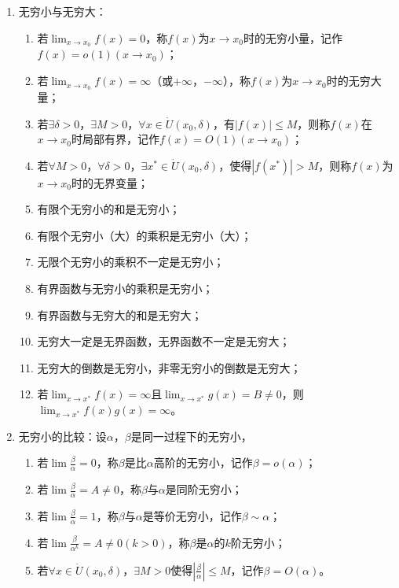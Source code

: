 \documentclass[UTF8]{ctexart}
\theoremstyle{remark}
\begin{document}
\begin{enumerate}
			\item 无穷小与无穷大：
			\begin{enumerate}
				\item 若$\lim _{x \to x_{0}} f(x)=0$，称$f(x)$为$x \to x_{0}$时的无穷小量，记作$f(x)=o(1)(x \to x_{0})$；
				\item 若$\lim _{x \to x_{0}} f(x)=\infty$（或$+\infty$，$-\infty$），称$f(x)$为$x \to x_{0}$时的无穷大量；
				\item 若$\exists \delta>0$，$\exists M>0$，$\forall x \in \dot{U}(x_{0}, \delta)$，有$|f(x)| \leq M$，则称$f(x)$在$x \to x_{0}$时局部有界，记作$f(x)=O(1)(x \to x_{0})$；
				\item 若$\forall M>0$，$\forall \delta>0$，$\exists x^{*} \in \dot{U}(x_{0}, \delta)$，使得$|f(x^{*})|>M$，则称$f(x)$为$x \to x_{0}$时的无界变量；
				\item 有限个无穷小的和是无穷小；
				\item 有限个无穷小（大）的乘积是无穷小（大）；
				\item 无限个无穷小的乘积不一定是无穷小；
				\item 有界函数与无穷小的乘积是无穷小；
				\item 有界函数与无穷大的和是无穷大；
				\item 无穷大一定是无界函数，无界函数不一定是无穷大；
				\item 无穷大的倒数是无穷小，非零无穷小的倒数是无穷大；
				\item 若$\lim _{x \to x^{*}} f(x)=\infty$且$\lim _{x \to x^{*}} g(x)=B \neq 0$，则$\lim _{x \to x^{*}} f(x) g(x)=\infty$。
			\end{enumerate}
			
			\item 无穷小的比较：设$\alpha$，$\beta$是同一过程下的无穷小，
			\begin{enumerate}
				\item 若$\lim \frac{\beta}{\alpha}=0$，称$\beta$是比$\alpha$高阶的无穷小，记作$\beta=o(\alpha)$；
				\item 若$\lim \frac{\beta}{\alpha}=A \neq 0$，称$\beta$与$\alpha$是同阶无穷小；
				\item 若$\lim \frac{\beta}{\alpha}=1$，称$\beta$与$\alpha$是等价无穷小，记作$\beta \sim \alpha$；
				\item 若$\lim \frac{\beta}{\alpha^{k}}=A \neq 0(k>0)$，称$\beta$是$\alpha$的$k$阶无穷小；
				\item 若$\forall x \in \dot{U}(x_{0}, \delta)$，$\exists M>0$使得$\left|\frac{\beta}{\alpha}\right| \leq M$，记作$\beta=O(\alpha)$。
			\end{enumerate}
			

\end{enumerate}
\end{document}
